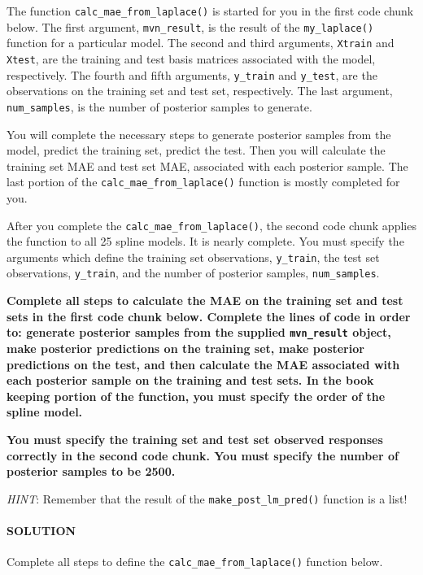 \documentclass[
]{article}
\begin{document}
The function \texttt{calc\_mae\_from\_laplace()} is started for you in
the first code chunk below. The first argument, \texttt{mvn\_result}, is
the result of the \texttt{my\_laplace()} function for a particular
model. The second and third arguments, \texttt{Xtrain} and
\texttt{Xtest}, are the training and test basis matrices associated with
the model, respectively. The fourth and fifth arguments,
\texttt{y\_train} and \texttt{y\_test}, are the observations on the
training set and test set, respectively. The last argument,
\texttt{num\_samples}, is the number of posterior samples to generate.

You will complete the necessary steps to generate posterior samples from
the model, predict the training set, predict the test. Then you will
calculate the training set MAE and test set MAE, associated with each
posterior sample. The last portion of the
\texttt{calc\_mae\_from\_laplace()} function is mostly completed for
you.

After you complete the \texttt{calc\_mae\_from\_laplace()}, the second
code chunk applies the function to all 25 spline models. It is nearly
complete. You must specify the arguments which define the training set
observations, \texttt{y\_train}, the test set observations,
\texttt{y\_train}, and the number of posterior samples,
\texttt{num\_samples}.

\textbf{Complete all steps to calculate the MAE on the training set and
test sets in the first code chunk below. Complete the lines of code in
order to: generate posterior samples from the supplied
\texttt{mvn\_result} object, make posterior predictions on the training
set, make posterior predictions on the test, and then calculate the MAE
associated with each posterior sample on the training and test sets. In
the book keeping portion of the function, you must specify the order of
the spline model.}

\textbf{You must specify the training set and test set observed
responses correctly in the second code chunk. You must specify the
number of posterior samples to be 2500.}

\emph{HINT}: Remember that the result of the
\texttt{make\_post\_lm\_pred()} function is a list!

\hypertarget{solution-15}{%
\paragraph{SOLUTION}\label{solution-15}}

Complete all steps to define the \texttt{calc\_mae\_from\_laplace()}
function below.
\end{document}
